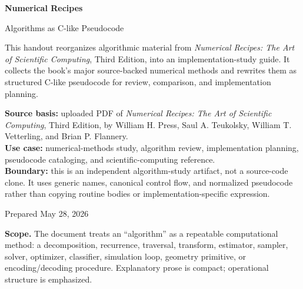 \documentclass[11pt]{article}
\begin{document}
\hypersetup{pageanchor=false}

\begin{titlepage}
  \centering
  \vspace*{2.0cm}
  {\Huge\bfseries\color{NRBlue}Numerical Recipes\par}
  \vspace{0.45cm}
  {\LARGE Algorithms as C-like Pseudocode\par}
  \vspace{1.2cm}
  \begin{scopebox}
  This handout reorganizes algorithmic material from \textit{Numerical Recipes: The Art of Scientific Computing}, Third Edition, into an implementation-study guide. It collects the book's major source-backed numerical methods and rewrites them as structured C-like pseudocode for review, comparison, and implementation planning.
  \end{scopebox}
  \vspace{0.85cm}
  \begin{methodbox}
  \textbf{Source basis:} uploaded PDF of \textit{Numerical Recipes: The Art of Scientific Computing}, Third Edition, by William H. Press, Saul A. Teukolsky, William T. Vetterling, and Brian P. Flannery.\\
  \textbf{Use case:} numerical-methods study, algorithm review, implementation planning, pseudocode cataloging, and scientific-computing reference.\\
  \textbf{Boundary:} this is an independent algorithm-study artifact, not a source-code clone. It uses generic names, canonical control flow, and normalized pseudocode rather than copying routine bodies or implementation-specific expression.
  \end{methodbox}
  \vfill
  {\large Prepared May 28, 2026\par}
\end{titlepage}

\hypersetup{pageanchor=true}
\tableofcontents
\clearpage
{}

\begin{scopebox}
\textbf{Scope.} The document treats an ``algorithm'' as a repeatable computational method: a decomposition, recurrence, traversal, transform, estimator, sampler, solver, optimizer, classifier, simulation loop, geometry primitive, or encoding/decoding procedure. Explanatory prose is compact; operational structure is emphasized.
\end{scopebox}
\end{document}
